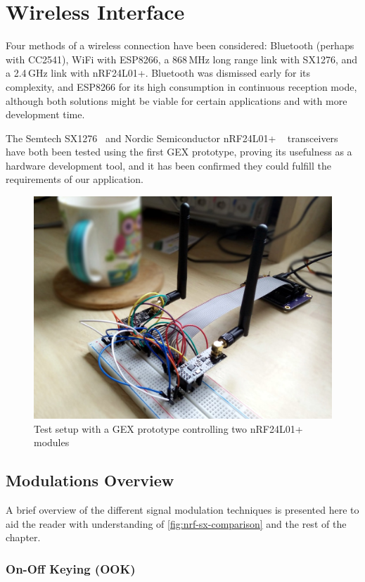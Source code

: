 \chapter{Wireless Interface} \label{sec:wireless}

Four methods of a wireless connection have been considered: Bluetooth (perhaps with CC2541), WiFi with ESP8266, a 868\,MHz long range link with SX1276, and a 2.4\,GHz link with nRF24L01+. Bluetooth was dismissed early for its complexity, and ESP8266 for its high consumption in continuous reception mode, although both solutions might be viable for certain applications and with more development time.

The Semtech SX1276~\cite{semtech-manual} and Nordic Semiconductor nRF24L01+ ~\cite{nrf-manual} transceivers have both been tested using the first GEX prototype, proving its usefulness as a hardware development tool, and it has been confirmed they could fulfill the requirements of our application.

\begin{figure}[h]
	\centering
	\includegraphics[width=.7\textwidth]{img/nrf-testing.jpg}
	\caption{Test setup with a GEX prototype controlling two nRF24L01+ modules}
\end{figure}

\section{Modulations Overview}

A brief overview of the different signal modulation techniques is presented here to aid the reader with understanding of \cref{fig:nrf-sx-comparison} and the rest of the chapter.

\subsection{On-Off Keying (OOK)}

